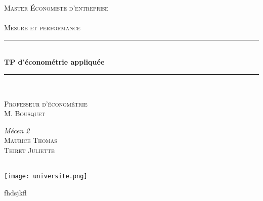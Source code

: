 \documentclass[12pt]{article}
\begin{document}
\newcommand{\HRule}{\rule{\linewidth}{0.5mm}}

\newcommand{\MEE}{\hspace{-.25cm}{\fontfamily{pnc} \selectfont{
\mbox{
{\color[RGB]{52,74,88}M}
\kern-.446em\lower.75ex\hbox{\color[RGB]{7,93,142}\'E}%
\kern-.1427em\lower.795ex\hbox{\color[RGB]{7,93,142}c}%
\kern-.511em\lower -.24ex\hbox{\color[cmyk]{0.85,0.43,0.37,0.08}$\mathbb{E}$}
\kern-.38em\lower -.24ex\hbox{\color[cmyk]{0.85,0.43,0.37,0.08}n}}}}
}




\begin{center}
	\textsc{\Large Master \'Economiste d'entreprise}\\[1cm]
	\hspace{-2cm}{\scalefont{7}\selectfont \MEE} \\\vspace{3cm}
	\textsc{\Large Mesure et performance}\\\vspace{2cm}
	\HRule \\\vspace{.5cm}
	{\Huge\bfseries TP d'économétrie appliquée}\\
	\vspace{.5cm}\HRule \\\vspace{3.2cm}


	\large{\begin{minipage}{0.4\textwidth}
		\begin{flushleft}
		\textsc{Professeur d'économétrie}\\\vspace{0.4cm}
		\textsc{M. Bousquet}\\\vspace{.5cm}
		\end{flushleft}
	\end{minipage}
	\begin{minipage}{0.4\textwidth}
		\begin{flushright}%
		\emph{Mécen 2} \\
		\textsc{Maurice Thomas}\\\vspace{0.4cm}
		\textsc{Thiret Juliette}\\\vspace{1cm}
		\textsc{}\\
		\end{flushright}
	\end{minipage}}


	\vspace{1cm}
	\texttt{[image: universite.png]}\\
\newpage
\end{center}


\fancyfoot[L]{\today}
\fancyhead[C]{}




fhdsjkfl
\end{document}
